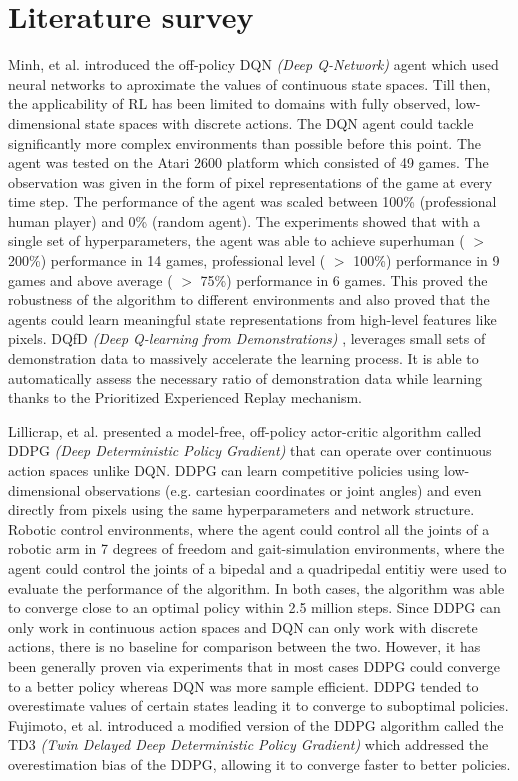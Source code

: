 \documentclass[12pt,a4paper]{article}
\begin{document}
\section{Literature survey}
Minh, et al. \cite{dqn} introduced the off-policy DQN \textit{(Deep Q-Network)} agent which
used neural networks to aproximate the values of continuous state spaces. Till then, the applicability of RL
has been limited to domains with fully observed, low-dimensional state spaces with
discrete actions. The DQN agent could tackle significantly more complex environments than possible before
this point. The agent was tested on the Atari 2600 platform which consisted of
49 games. The observation was given in the form of pixel representations of the game at every time step.
The performance of the agent was scaled between 100\% (professional human player) and 0\% (random agent).
The experiments showed that with a single set of hyperparameters, the agent
was able to achieve superhuman ( $>$ 200\%) performance in 14 games, professional level
( $>$ 100\%) performance in 9 games and above average ( $>$ 75\%) performance in 6 games.
This proved the robustness of the algorithm to different environments and also proved that
the agents could learn meaningful state representations from high-level features like pixels.
DQfD \textit{(Deep Q-learning from Demonstrations)} \cite{dqdf}, leverages small sets of demonstration data to 
massively accelerate the learning process. It is able to automatically assess the necessary ratio of demonstration data while 
learning thanks to the Prioritized Experienced Replay \cite{per} mechanism.

Lillicrap, et al. \cite{ddpg} presented a model-free, off-policy actor-critic
algorithm called DDPG \textit{(Deep Deterministic Policy Gradient)} that can operate over continuous action spaces unlike DQN.  
DDPG can learn competitive policies using low-dimensional 
observations (e.g. cartesian coordinates or joint angles) and even directly from pixels 
using the same hyperparameters and network structure. Robotic control environments, where 
the agent could control all the joints of a robotic arm in 7 degrees of freedom and gait-simulation environments, 
where the agent could control the joints of a bipedal and a quadripedal entitiy were used to evaluate the performance
of the algorithm. In both cases, the algorithm was able to converge close to an optimal policy within 2.5 million 
steps. Since DDPG can only work in continuous action spaces and DQN can only work with discrete actions, there
is no baseline for comparison between the two. However, it has been generally proven via experiments that
in most cases DDPG could converge to a better policy whereas DQN was more sample efficient. DDPG tended to overestimate
values of certain states leading it to converge to suboptimal policies. Fujimoto, et al. \cite{td3} introduced
a modified version of the DDPG algorithm called the TD3 \textit{(Twin Delayed Deep Deterministic Policy Gradient)} which addressed the 
overestimation bias of the DDPG, allowing it to converge faster to better policies.
\end{document}
